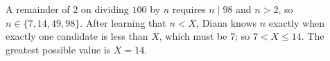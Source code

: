 A remainder of $2$ on dividing $100$ by $n$ requires $n\mid98$ and $n>2$, so $n\in\{7,14,49,98\}$. After learning that $n<X$, Diana knows $n$ exactly when exactly one candidate is less than $X$, which must be $7$; so $7<X\le14$. The greatest possible value is $X=\boxed{14}$.
